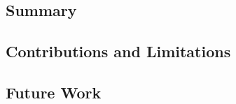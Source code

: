 \documentclass[12pt,a4paper]{article}
\begin{document}
\subsection{Summary}


\subsection{Contributions and Limitations}


\subsection{Future Work}





%
%
%
%
%
%
%
%
	
	
	
	
	\newpage
	\begin{spacing}{0.9}
		\printbibliography
	\end{spacing}
	
	
	
	
	
	
	
	
\end{document}
